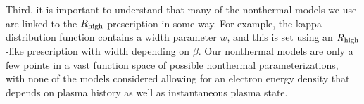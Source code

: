 Third, it is important to understand that many of the nonthermal models we use are linked to the $R_\mathrm{high}$ prescription in some way.  For example, the kappa distribution function contains a width parameter $w$, and this is set using an $R_\mathrm{high}$-like prescription with width depending on $\beta$.  Our nonthermal models are only a few points in a vast function space of possible nonthermal parameterizations, with none of the models considered allowing for an electron energy density that depends on plasma history as well as instantaneous plasma state.






